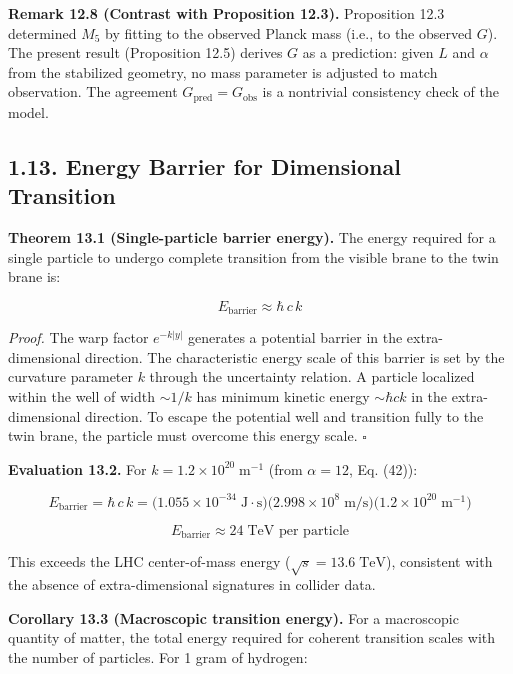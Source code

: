 \documentclass[
  11pt,
]{article}
\begin{document}
\textbf{Remark 12.8 (Contrast with Proposition 12.3).} Proposition 12.3
determined \(M_5\) by fitting to the observed Planck mass (i.e., to the
observed \(G\)). The present result (Proposition 12.5) derives \(G\) as
a prediction: given \(L\) and \(\alpha\) from the stabilized geometry,
no mass parameter is adjusted to match observation. The agreement
\(G_{\text{pred}} = G_{\text{obs}}\) is a nontrivial consistency check
of the model.

\bigskip

\hypertarget{energy-barrier-for-dimensional-transition}{%
\subsection{1.13. Energy Barrier for Dimensional
Transition}\label{energy-barrier-for-dimensional-transition}}

\textbf{Theorem 13.1 (Single-particle barrier energy).} The energy
required for a single particle to undergo complete transition from the
visible brane to the twin brane is:

\[E_{\text{barrier}} \approx \hbar\,c\,k \tag{53}\]

\emph{Proof.} The warp factor \(e^{-k|y|}\) generates a potential
barrier in the extra-dimensional direction. The characteristic energy
scale of this barrier is set by the curvature parameter \(k\) through
the uncertainty relation. A particle localized within the well of width
\(\sim 1/k\) has minimum kinetic energy \(\sim \hbar c k\) in the
extra-dimensional direction. To escape the potential well and transition
fully to the twin brane, the particle must overcome this energy scale.
\(\square\)

\textbf{Evaluation 13.2.} For \(k = 1.2 \times 10^{20}\;\text{m}^{-1}\)
(from \(\alpha = 12\), Eq. (42)):

\[E_{\text{barrier}} = \hbar\,c\,k = \bigl(1.055 \times 10^{-34}\;\text{J}{\cdot}\text{s}\bigr)\bigl(2.998 \times 10^{8}\;\text{m/s}\bigr)\bigl(1.2 \times 10^{20}\;\text{m}^{-1}\bigr) \tag{54}\]

\[\boxed{E_{\text{barrier}} \approx 24\;\text{TeV per particle}} \tag{55}\]

This exceeds the LHC center-of-mass energy
(\(\sqrt{s} = 13.6\;\text{TeV}\)), consistent with the absence of
extra-dimensional signatures in collider data.

\textbf{Corollary 13.3 (Macroscopic transition energy).} For a
macroscopic quantity of matter, the total energy required for coherent
transition scales with the number of particles. For 1 gram of hydrogen:
\end{document}
